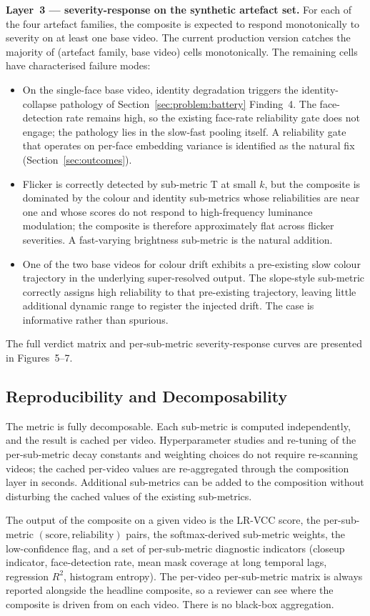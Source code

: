 \textbf{Layer~3 --- severity-response on the synthetic artefact set.} For each of the four
artefact families, the composite is expected to respond monotonically to severity on at
least one base video. The current production version catches the majority of (artefact
family, base video) cells monotonically. The remaining cells have characterised failure
modes:
\begin{itemize}
    \item On the single-face base video, identity degradation triggers the
          identity-collapse pathology of Section~\ref{sec:problem:battery} Finding~4. The
          face-detection rate remains high, so the existing face-rate reliability gate does
          not engage; the pathology lies in the slow-fast pooling itself. A reliability
          gate that operates on per-face embedding variance is identified as the natural
          fix (Section~\ref{sec:outcomes}).
    \item Flicker is correctly detected by sub-metric T at small $k$, but the composite is
          dominated by the colour and identity sub-metrics whose reliabilities are near
          one and whose scores do not respond to high-frequency luminance modulation; the
          composite is therefore approximately flat across flicker severities. A
          fast-varying brightness sub-metric is the natural addition.
    \item One of the two base videos for colour drift exhibits a pre-existing slow colour
          trajectory in the underlying super-resolved output. The slope-style sub-metric
          correctly assigns high reliability to that pre-existing trajectory, leaving
          little additional dynamic range to register the injected drift. The case is
          informative rather than spurious.
\end{itemize}

The full verdict matrix and per-sub-metric severity-response curves are presented in
Figures~5--7.

\subsection{Reproducibility and Decomposability}

The metric is fully decomposable. Each sub-metric is computed independently, and the result
is cached per video. Hyperparameter studies and re-tuning of the per-sub-metric decay
constants and weighting choices do not require re-scanning videos; the cached per-video
values are re-aggregated through the composition layer in seconds. Additional sub-metrics
can be added to the composition without disturbing the cached values of the existing
sub-metrics.

The output of the composite on a given video is the LR-VCC score, the per-sub-metric
$(\text{score}, \text{reliability})$ pairs, the softmax-derived sub-metric weights, the
low-confidence flag, and a set of per-sub-metric diagnostic indicators (closeup indicator,
face-detection rate, mean mask coverage at long temporal lags, regression $R^2$, histogram
entropy). The per-video per-sub-metric matrix is always reported alongside the headline
composite, so a reviewer can see where the composite is driven from on each video. There is
no black-box aggregation.
